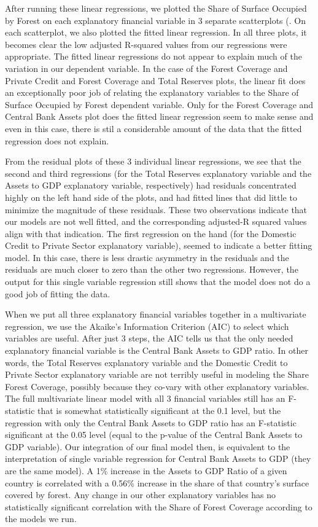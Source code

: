 \documentclass[
  12pt,
]{article}
\begin{document}
After running these linear regressions, we plotted the Share of Surface
Occupied by Forest on each explanatory financial variable in 3 separate
scatterplots (. On each scatterplot, we also plotted the fitted linear
regression. In all three plots, it becomes clear the low adjusted
R-squared values from our regressions were appropriate. The fitted
linear regressions do not appear to explain much of the variation in our
dependent variable. In the case of the Forest Coverage and Private
Credit and Forest Coverage and Total Reserves plots, the linear fit does
an exceptionally poor job of relating the explanatory variables to the
Share of Surface Occupied by Forest dependent variable. Only for the
Forest Coverage and Central Bank Assets plot does the fitted linear
regression seem to make sense and even in this case, there is stil a
considerable amount of the data that the fitted regression does not
explain.

From the residual plots of these 3 individual linear regressions, we see
that the second and third regressions (for the Total Reserves
explanatory variable and the Assets to GDP explanatory variable,
respectively) had residuals concentrated highly on the left hand side of
the plots, and had fitted lines that did little to minimize the
magnitude of these residuals. These two observations indicate that our
models are not well fitted, and the corresponding adjusted-R squared
values align with that indication. The first regression on the hand (for
the Domestic Credit to Private Sector explanatory variable), seemed to
indicate a better fitting model. In this case, there is less drastic
asymmetry in the residuals and the residuals are much closer to zero
than the other two regressions. However, the output for this single
variable regression still shows that the model does not do a good job of
fitting the data.

When we put all three explanatory financial variables together in a
multivariate regression, we use the Akaike's Information Criterion (AIC)
to select which variables are useful. After just 3 steps, the AIC tells
us that the only needed explanatory financial variable is the Central
Bank Assets to GDP ratio. In other words, the Total Reserves explanatory
variable and the Domestic Credit to Private Sector explanatory variable
are not terribly useful in modeling the Share Forest Coverage, possibly
because they co-vary with other explanatory variables. The full
multivariate linear model with all 3 financial variables still has an
F-statistic that is somewhat statistically significant at the 0.1 level,
but the regression with only the Central Bank Assets to GDP ratio has an
F-statistic significant at the 0.05 level (equal to the p-value of the
Central Bank Assets to GDP variable). Our integration of our final model
then, is equivalent to the interpretation of single variable regression
for Central Bank Assets to GDP (they are the same model). A 1\% increase
in the Assets to GDP Ratio of a given country is correlated with a
0.56\% increase in the share of that country's surface covered by
forest. Any change in our other explanatory variables has no
statistically significant correlation with the Share of Forest Coverage
according to the models we run.
\end{document}

